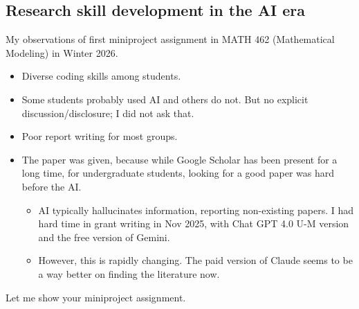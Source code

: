 \documentclass[20pt]{extarticle}
\begin{document}
\subsection*{Research skill development in the AI era}

My observations of first miniproject assignment in MATH 462 (Mathematical Modeling) in Winter 2026.
\begin{itemize}
\item Diverse coding skills among students.
\item Some students probably used AI and others do not. But no explicit discussion/disclosure; I did not ask that.
\item Poor report writing for most groups.
\item The paper was given, because while Google Scholar has been present for a long time, for undergraduate students, looking for a good paper was hard before the AI.
	\begin{itemize}
	\item AI typically hallucinates information, reporting non-existing papers. I had hard time in grant writing in Nov 2025, with Chat GPT 4.0 U-M version and
	the free version of Gemini.
	\item However, this is rapidly changing. The paid version of Claude seems to be a way better on finding the literature now. 
	\end{itemize}
\end{itemize}

Let me show your miniproject assignment.
\end{document}
